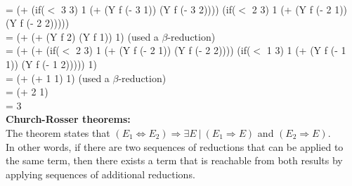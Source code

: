 \documentclass[11pt]{article}
\begin{document}
\\ = (+ (if($<$ 3 3) 1 (+ (Y f (- 3 1)) (Y f (- 3 2)))) (if($<$ 2 3) 1 (+ (Y f (- 2 1)) (Y f (- 2 2)))))
\\ = (+ (+ (Y f 2) (Y f 1)) 1) (used a $\beta$-reduction)
\\ = (+ (+ (if($<$ 2 3) 1 (+ (Y f (- 2 1)) (Y f (- 2 2)))) (if($<$ 1 3) 1 (+ (Y f (- 1 1)) (Y f (- 1 2))))) 1)
\\ = (+ (+ 1 1) 1) (used a $\beta$-reduction)
\\ = (+ 2 1)
\\ = 3
\\ \textbf{Church-Rosser theorems:}
\\ The theorem states that $(E_1 \Leftrightarrow E_2) \Rightarrow \exists E\ |\ (E_1 \Rightarrow E)$ and $(E_2 \Rightarrow E)$.
\\ In other words, if there are two sequences of reductions that can be applied to the same term, then there exists a term that is reachable from both results by applying sequences of additional reductions.
\end{document}
